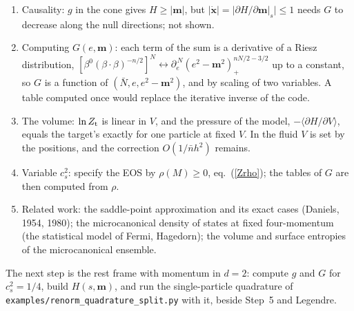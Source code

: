 \documentclass[11pt,aps,preprint,nofootinbib,superscriptaddress,tightenlines]{revtex4-2}
\newcommand{\avg}[1]{\langle #1\rangle}
\def\Eq#1{eq.~(\ref{#1})}
\begin{document}
\begin{enumerate}
\item Causality: $g$ in the cone gives $H\ge|\bm m|$, but $|\dot{\bm x}|=|\partial H/\partial\bm m|_s|\le1$ needs $G$ to decrease along the null
  directions; not shown.
\item Computing $G(e,\bm m)$: each term of the sum is a derivative of a Riesz distribution,
  $[\beta^0(\beta\cdot\beta)^{-n/2}]^N\leftrightarrow\partial_e^{\,N}(e^2-\bm m^2)_+^{nN/2-3/2}$ up to a constant, so $G$ is a function of
  $(\bar N, e, e^2-\bm m^2)$, and by scaling of two variables.  A table computed once would replace the iterative inverse of the code.
\item The volume: $\ln Z_{\rm t}$ is linear in $V$, and the pressure of the model, $-\avg{\partial H/\partial V}$, equals the target's exactly
  for one particle at fixed $V$.  In the fluid $V$ is set by the positions, and the correction $O(1/\bar nh^2)$ remains.
\item Variable $c_s^2$: specify the EOS by $\rho(M)\ge0$, \Eq{Zrho}; the tables of $G$ are then computed from $\rho$.
\item Related work: the saddle-point approximation and its exact cases (Daniels, 1954, 1980); the microcanonical density of states at fixed
  four-momentum (the statistical model of Fermi, Hagedorn); the volume and surface entropies of the microcanonical ensemble.
\end{enumerate}
The next step is the rest frame with momentum in $d=2$: compute $g$ and $G$ for $c_s^2=1/4$, build $H(s,\bm m)$, and run the single-particle
quadrature of \nolinkurl{examples/renorm_quadrature_split.py} with it, beside Step~5 and Legendre.
\end{document}
